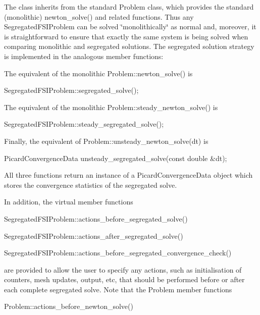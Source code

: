 The class inherits from the standard {\ttfamily Problem} class, which provides the standard (monolithic) {\ttfamily newton\+\_\+solve()} and related functions. Thus any {\ttfamily Segregated\+F\+S\+I\+Problem} can be solved \char`\"{}monolithically\char`\"{} as normal and, moreover, it is straightforward to ensure that exactly the same system is being solved when comparing monolithic and segregated solutions. The segregated solution strategy is implemented in the analogous member functions\+:
\begin{DoxyItemize}
\item The equivalent of the monolithic {\ttfamily Problem\+::newton\+\_\+solve()} is 
\begin{DoxyCode}
SegregatedFSIProblem::segregated\_solve();
\end{DoxyCode}

\item The equivalent of the monolithic {\ttfamily Problem\+::steady\+\_\+newton\+\_\+solve()} is 
\begin{DoxyCode}
SegregatedFSIProblem::steady\_segregated\_solve();
\end{DoxyCode}

\item Finally, the equivalent of {\ttfamily Problem\+::unsteady\+\_\+newton\+\_\+solve(dt)} is 
\begin{DoxyCode}
PicardConvergenceData unsteady\_segregated\_solve(\textcolor{keyword}{const} \textcolor{keywordtype}{double} &dt);
\end{DoxyCode}

\end{DoxyItemize}All three functions return an instance of a {\ttfamily Picard\+Convergence\+Data} object which stores the convergence statistics of the segregated solve.

In addition, the virtual member functions 
\begin{DoxyCode}
SegregatedFSIProblem::actions\_before\_segregated\_solve() 
\end{DoxyCode}
 
\begin{DoxyCode}
SegregatedFSIProblem::actions\_after\_segregated\_solve() 
\end{DoxyCode}
 
\begin{DoxyCode}
SegregatedFSIProblem::actions\_before\_segregated\_convergence\_check() 
\end{DoxyCode}
 are provided to allow the user to specify any actions, such as initialisation of counters, mesh updates, output, etc, that should be performed before or after each complete segregated solve. Note that the {\ttfamily Problem} member functions 
\begin{DoxyCode}
Problem::actions\_before\_newton\_solve() 
\end{DoxyCode}
 
